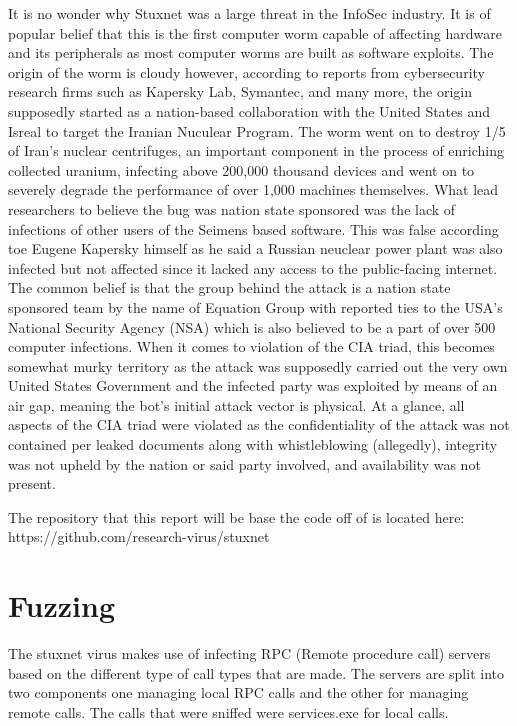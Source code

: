 \documentclass[12pt, letterpaper]{article}
\begin{document}
\begin{sloppypar}
\begin{flushleft}
It is no wonder why Stuxnet was a 
large threat in the InfoSec industry. It is of popular belief that this is
the first computer worm capable of affecting hardware and its peripherals as
most computer worms are built as software exploits. The origin of the worm is 
cloudy however, according to reports from cybersecurity research firms such 
as Kapersky Lab, Symantec, and many more, the origin supposedly started as 
a nation-based collaboration with the United States and Isreal to target the
Iranian Nuculear Program. The worm went on to destroy 1/5 of Iran's nuclear 
centrifuges, an important component in the process of enriching collected
uranium, infecting above 200,000 thousand devices and went on to severely 
degrade the performance of over 1,000 machines themselves. What lead 
researchers to believe the bug was nation state sponsored was the lack of
infections of other users of the Seimens based software. This was false 
according toe Eugene Kapersky himself as he said a Russian neuclear power
plant was also infected but not affected since it lacked any access to the
public-facing internet. The common belief is that the group behind the attack
is a nation state sponsored team by the name of Equation Group with reported
ties to the USA's National Security Agency (NSA) which is also believed to 
be a part of over 500 computer infections. When it comes to violation of the 
CIA triad, this becomes somewhat murky territory as the attack was supposedly
carried out the very own United States Government and the infected party was
exploited by means of an air gap, meaning the bot's initial attack vector
is physical. At a glance, all aspects of the CIA triad were violated as 
the confidentiality of the attack was not contained per leaked documents 
along with whistleblowing (allegedly), integrity was not upheld by the nation
or said party involved, and availability was not present.


The repository that this report will be base the code off of is located 
here: https://github.com/research-virus/stuxnet




\section{Fuzzing}
The stuxnet virus makes use of infecting RPC (Remote procedure call) servers based on 
the different type of call types that are made. The servers are split into two 
components one managing local RPC calls and the other for managing remote calls. 
The calls that were sniffed were services.exe for local calls.


\end{flushleft}
\end{sloppypar}
\end{document}

